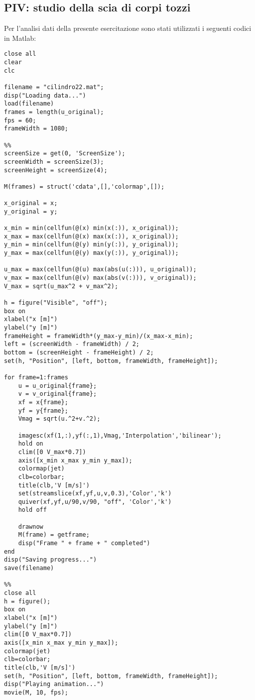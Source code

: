 \subsection{PIV: studio della scia di corpi tozzi}\label{b11}
Per l'analisi dati della presente esercitazione sono stati utilizzati i seguenti codici in Matlab:
\begin{lstlisting}[style=Matlab-editor, basicstyle=\ttfamily\footnotesize]
% Codice per generare i fotogrammi delle animazioni
close all
clear
clc

filename = "cilindro22.mat";
disp("Loading data...")
load(filename)
frames = length(u_original);
fps = 60;
frameWidth = 1080;

%%
screenSize = get(0, 'ScreenSize');
screenWidth = screenSize(3);
screenHeight = screenSize(4);

M(frames) = struct('cdata',[],'colormap',[]);

x_original = x;
y_original = y;

x_min = min(cellfun(@(x) min(x(:)), x_original));
x_max = max(cellfun(@(x) max(x(:)), x_original));
y_min = min(cellfun(@(y) min(y(:)), y_original));
y_max = max(cellfun(@(y) max(y(:)), y_original));

u_max = max(cellfun(@(u) max(abs(u(:))), u_original));
v_max = max(cellfun(@(v) max(abs(v(:))), v_original));
V_max = sqrt(u_max^2 + v_max^2);

h = figure("Visible", "off");
box on
xlabel("x [m]")
ylabel("y [m]")
frameHeight = frameWidth*(y_max-y_min)/(x_max-x_min);
left = (screenWidth - frameWidth) / 2;
bottom = (screenHeight - frameHeight) / 2;
set(h, "Position", [left, bottom, frameWidth, frameHeight]);

for frame=1:frames
    u = u_original{frame};
    v = v_original{frame};
    xf = x{frame};
    yf = y{frame};
    Vmag = sqrt(u.^2+v.^2);
    
    imagesc(xf(1,:),yf(:,1),Vmag,'Interpolation','bilinear');
    hold on
    clim([0 V_max*0.7])
    axis([x_min x_max y_min y_max]);
    colormap(jet)
    clb=colorbar;
    title(clb,'V [m/s]')
    set(streamslice(xf,yf,u,v,0.3),'Color','k')
    quiver(xf,yf,u/90,v/90, "off", 'Color','k')
    hold off

    drawnow
    M(frame) = getframe;
    disp("Frame " + frame + " completed")
end
disp("Saving progress...")
save(filename)

%%
close all
h = figure();
box on
xlabel("x [m]")
ylabel("y [m]")
clim([0 V_max*0.7])
axis([x_min x_max y_min y_max]);
colormap(jet)
clb=colorbar;
title(clb,'V [m/s]')
set(h, "Position", [left, bottom, frameWidth, frameHeight]);
disp("Playing animation...")
movie(M, 10, fps);
\end{lstlisting}

